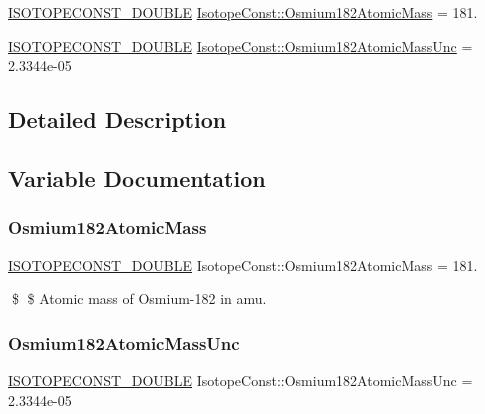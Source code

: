 \begin{DoxyCompactItemize}
\item 
\mbox{\hyperlink{group___isotope_const-_macros_ga8f45a7272ce02c0b4c65c44636ed719a}{I\+S\+O\+T\+O\+P\+E\+C\+O\+N\+S\+T\+\_\+\+D\+O\+U\+B\+LE}} \mbox{\hyperlink{group___isotope_const-_osmium-_os182_gaf7c0daac2c32a0fc65e4829d2e4dd880}{Isotope\+Const\+::\+Osmium182\+Atomic\+Mass}} = 181.
\item 
\mbox{\hyperlink{group___isotope_const-_macros_ga8f45a7272ce02c0b4c65c44636ed719a}{I\+S\+O\+T\+O\+P\+E\+C\+O\+N\+S\+T\+\_\+\+D\+O\+U\+B\+LE}} \mbox{\hyperlink{group___isotope_const-_osmium-_os182_ga0a28d7e76dd5eae2044837749efdcf6e}{Isotope\+Const\+::\+Osmium182\+Atomic\+Mass\+Unc}} = 2.\+3344e-\/05
\end{DoxyCompactItemize}


\subsection{Detailed Description}


\subsection{Variable Documentation}
\mbox{\label{group___isotope_const-_osmium-_os182_gaf7c0daac2c32a0fc65e4829d2e4dd880}} 
\subsubsection{\texorpdfstring{Osmium182\+Atomic\+Mass}{Osmium182AtomicMass}}
{\footnotesize\ttfamily \mbox{\hyperlink{group___isotope_const-_macros_ga8f45a7272ce02c0b4c65c44636ed719a}{I\+S\+O\+T\+O\+P\+E\+C\+O\+N\+S\+T\+\_\+\+D\+O\+U\+B\+LE}} Isotope\+Const\+::\+Osmium182\+Atomic\+Mass = 181.}

\$ \$ Atomic mass of Osmium-\/182 in amu. \mbox{\label{group___isotope_const-_osmium-_os182_ga0a28d7e76dd5eae2044837749efdcf6e}} 
\subsubsection{\texorpdfstring{Osmium182\+Atomic\+Mass\+Unc}{Osmium182AtomicMassUnc}}
{\footnotesize\ttfamily \mbox{\hyperlink{group___isotope_const-_macros_ga8f45a7272ce02c0b4c65c44636ed719a}{I\+S\+O\+T\+O\+P\+E\+C\+O\+N\+S\+T\+\_\+\+D\+O\+U\+B\+LE}} Isotope\+Const\+::\+Osmium182\+Atomic\+Mass\+Unc = 2.\+3344e-\/05}

